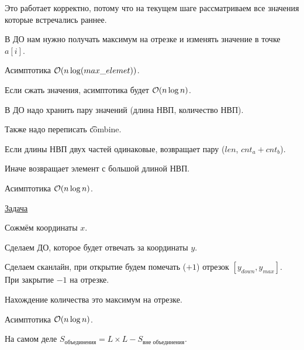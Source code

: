 \down

Это работает корректно, потому что на текущем шаге рассматриваем все значения которые встречались раннее. 

\down

В ДО нам нужно получать максимум на отрезке и изменять значение в точке $a[i]$.

Асимптотика $\mathcal{O}(n \log(max\_elemet))$.

Если сжать значения, асимптотика будет $\mathcal{O}(n \log n)$.


В ДО надо хранить пару значений (длина НВП, количество НВП).

Также надо переписать \t{combine}.

\up \up

\begin{MyList}[0pt]
	\item Если длины НВП двух частей одинаковые, возвращает пару ($len$, $cnt_a + cnt_b$).
	
	\item Иначе возвращает элемент с большой длиной НВП.
\end{MyList} \up \up


Асимптотика $\mathcal{O}(n \log n)$.


\pagebreak


\href{https://informatics.mccme.ru/mod/statements/view3.php?chapterid=111800}{Задача} \href{https://pastebin.com/0psZgeC1}{}

Сожмём координаты $x$.

Сделаем ДО, которое будет отвечать за координаты $y$.

Сделаем сканлайн, при открытие будем помечать ($+1$) отрезок $[y_{down}, y_{max}]$. При закрытие $-1$ на отрезке.

Нахождение количества это максимум на отрезке. 

Асимптотика $\mathcal{O}(n \log n)$.


\href{http://informatics.mccme.ru/mod/statements/view3.php?id=20962&chapterid=3858#1}{} \href{https://pastebin.com/MqQAEafF}{}

На самом деле $S_{\text{объединения}}=L \times L - S_{\text{вне объединения}}$. 

